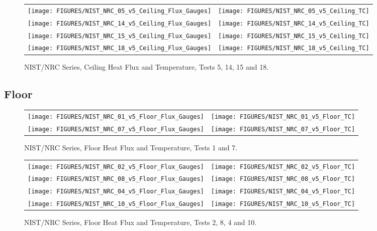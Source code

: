 \begin{figure}[p]
\begin{tabular*}{\textwidth}{l@{\extracolsep{\fill}}r}
\texttt{[image: FIGURES/NIST\_NRC\_05\_v5\_Ceiling\_Flux\_Gauges]} &
\texttt{[image: FIGURES/NIST\_NRC\_05\_v5\_Ceiling\_TC]} \\
\texttt{[image: FIGURES/NIST\_NRC\_14\_v5\_Ceiling\_Flux\_Gauges]} &
\texttt{[image: FIGURES/NIST\_NRC\_14\_v5\_Ceiling\_TC]} \\
\texttt{[image: FIGURES/NIST\_NRC\_15\_v5\_Ceiling\_Flux\_Gauges]} &
\texttt{[image: FIGURES/NIST\_NRC\_15\_v5\_Ceiling\_TC]} \\
\texttt{[image: FIGURES/NIST\_NRC\_18\_v5\_Ceiling\_Flux\_Gauges]} &
\texttt{[image: FIGURES/NIST\_NRC\_18\_v5\_Ceiling\_TC]}
\end{tabular*}
\caption{NIST/NRC Series, Ceiling Heat Flux and Temperature, Tests 5, 14, 15 and 18.}
\label{NIST_NRC_Ceiling_4}
\end{figure}

\clearpage



\subsection{Floor}

\vspace{2in}


\begin{figure}[h!]
\begin{tabular*}{\textwidth}{l@{\extracolsep{\fill}}r}
\texttt{[image: FIGURES/NIST\_NRC\_01\_v5\_Floor\_Flux\_Gauges]} &
\texttt{[image: FIGURES/NIST\_NRC\_01\_v5\_Floor\_TC]} \\
\texttt{[image: FIGURES/NIST\_NRC\_07\_v5\_Floor\_Flux\_Gauges]} &
\texttt{[image: FIGURES/NIST\_NRC\_07\_v5\_Floor\_TC]}

\end{tabular*}
\caption{NIST/NRC Series, Floor Heat Flux and Temperature, Tests 1 and 7.}
\label{NIST_NRC_Floor_1}
\end{figure}

\begin{figure}[p]
\begin{tabular*}{\textwidth}{l@{\extracolsep{\fill}}r}
\texttt{[image: FIGURES/NIST\_NRC\_02\_v5\_Floor\_Flux\_Gauges]} &
\texttt{[image: FIGURES/NIST\_NRC\_02\_v5\_Floor\_TC]} \\
\texttt{[image: FIGURES/NIST\_NRC\_08\_v5\_Floor\_Flux\_Gauges]} &
\texttt{[image: FIGURES/NIST\_NRC\_08\_v5\_Floor\_TC]} \\
\texttt{[image: FIGURES/NIST\_NRC\_04\_v5\_Floor\_Flux\_Gauges]} &
\texttt{[image: FIGURES/NIST\_NRC\_04\_v5\_Floor\_TC]} \\
\texttt{[image: FIGURES/NIST\_NRC\_10\_v5\_Floor\_Flux\_Gauges]} &
\texttt{[image: FIGURES/NIST\_NRC\_10\_v5\_Floor\_TC]}

\end{tabular*}
\caption{NIST/NRC Series, Floor Heat Flux and Temperature, Tests 2, 8, 4 and 10.}
\label{NIST_NRC_Floor_2}
\end{figure}


